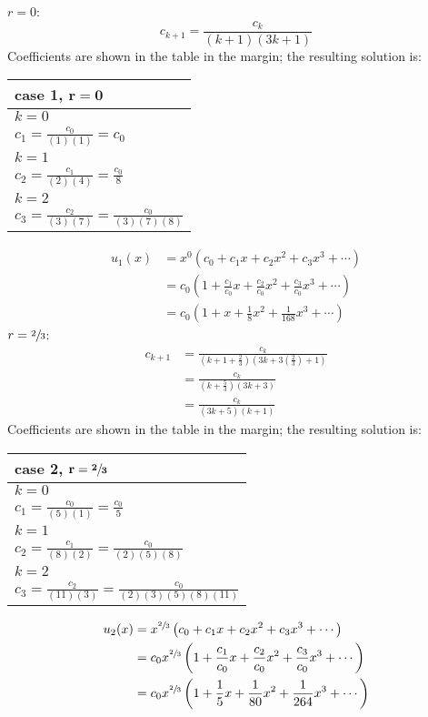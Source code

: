 \vspace{0.25cm}
\noindent\underline{$r=0$}:
\begin{equation*}
c_{k+1} = \frac{c_k}{(k+1)(3k+1)}
\end{equation*}
\noindent Coefficients are shown in the table in the margin; the resulting solution is:
\begin{margintable}
\begin{tabular}{|l|} 
\hline
\textbf{case 1, } $\mathbf{r = 0}$ \\\hline
$k = 0$ \\
$c_1 = \frac{c_0}{(1)(1)} = c_0$ \\\hline
$k = 1$ \\
$c_2 = \frac{c_1}{(2)(4)} = \frac{c_0}{8}$ \\\hline
$k=2$ \\
$c_3 = \frac{c_2}{(3)(7)} = \frac{c_0}{(3)(7)(8)}$\\\hline
\end{tabular}
\end{margintable}

\begin{align*}
u_1(x) &= x^0\left(c_0 + c_1x + c_2x^2 + c_3x^3 + \cdots \right) \\
&= c_0\left(1 + \frac{c_1}{c_0}x + \frac{c_2}{c_0}x^2 + \frac{c_3}{c_0}x^3 + \cdots \right) \\
&= c_0\left(1+x+\frac{1}{8}x^2+\frac{1}{168}x^3+\cdots \right)
\end{align*}
\vspace{0.25cm}
\noindent\underline{$r=\sfrac{2}{3}$}:
\begin{align*}
c_{k+1} &=\frac{c_k}{(k+1+\frac{2}{3})(3k+3\left(\frac{2}{3}\right)+1)}\\
&=\frac{c_k}{\left(k+\frac{5}{3}\right)(3k+3)} \\
&=\frac{c_k}{(3k+5)(k+1)}
\end{align*}
\noindent Coefficients are shown in the table in the margin; the resulting solution is:
\begin{margintable}
\begin{tabular}{|l|}
\hline
\textbf{case 2, } $\mathbf{r=\sfrac{2}{3}}$ \\\hline
$k=0$ \\
$c_1 = \frac{c_0}{(5)(1)} = \frac{c_0}{5}$ \\\hline
$k=1$ \\
$c_2 = \frac{c_1}{(8)(2)} = \frac{c_0}{(2)(5)(8)}$ \\\hline
$k=2$ \\
$c_3 = \frac{c_2}{(11)(3)} = \frac{c_0}{(2)(3)(5)(8)(11)}$\\\hline
\end{tabular}
\end{margintable}
\begin{align*}
u_2(x) &= x^{\sfrac{2}{3}}\left(c_0 + c_1x + c_2x^2 + c_3x^3 + \cdots \right) \\
&= c_0x^{\sfrac{2}{3}}\left(1 + \frac{c_1}{c_0}x+\frac{c_2}{c_0}x^2+\frac{c_3}{c_0}x^3 + \cdots \right) \\
&= c_0x^{\sfrac{2}{3}}\left(1+\frac{1}{5}x + \frac{1}{80}x^2+\frac{1}{264}x^3 + \cdots  \right)
\end{align*}

